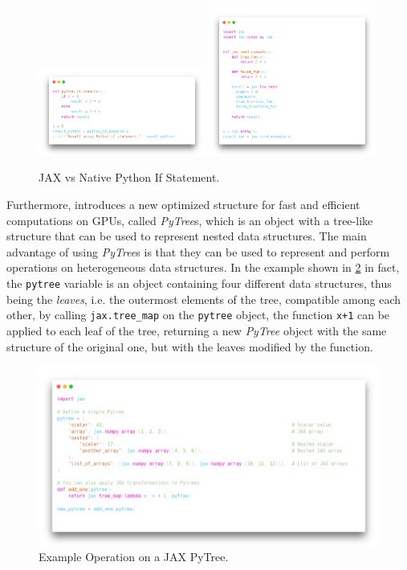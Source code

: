 \begin{figure}[h]
    \centering
    \caption{JAX vs Native Python If Statement.}
    \label{fig:jax_python_if}
    \includegraphics[width=0.49\textwidth]{Images/python_if.png}
    \includegraphics[width=0.49\textwidth]{Images/jax_if.png}
\end{figure}

Furthermore, \jax introduces a new optimized structure for fast and efficient computations on \ac{GPU}s, called \textit{PyTree}s, which is an object with a tree-like structure that can be used to represent nested data structures. The main advantage of using \textit{PyTree}s is that they can be used to represent and perform operations on heterogeneous data structures. In the example shown in \cref{fig:pytree_example} in fact, the \texttt{pytree} variable is an object containing four different data structures, thus being the \textit{leaves}, i.e. the outermost elements of the tree, compatible among each other, by calling \texttt{jax.tree\_map} on the \texttt{pytree} object, the function \texttt{x+1} can be applied to each leaf of the tree, returning a new \textit{PyTree} object with the same structure of the original one, but with the leaves modified by the function.

\begin{figure}[h]
    \centering
    \caption{Example Operation on a JAX PyTree.}
    \label{fig:pytree_example}
    \includegraphics[width=\textwidth]{Images/pytree_example.png}
\end{figure}

